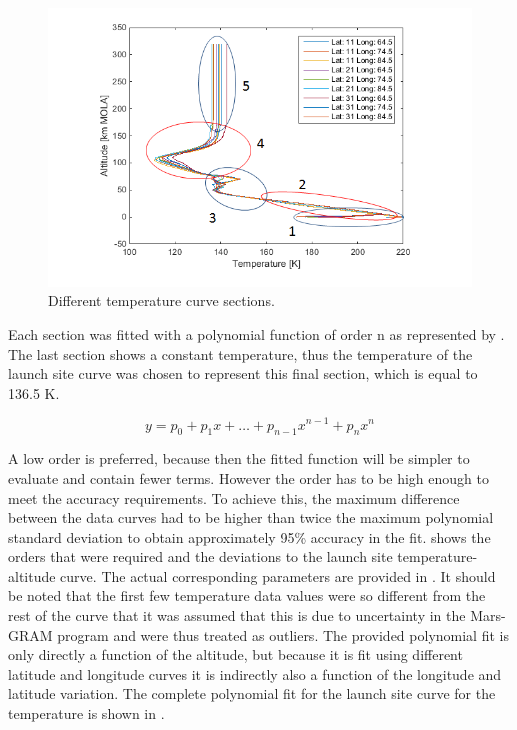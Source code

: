 \begin{figure}[H]
\centering
\includegraphics[width=1.0\textwidth]{figures/software/temperatureDataSplit5.png}
\caption{Different temperature curve sections.}
\label{fig:temperatureDataSplit5}
\end{figure}

\noindent
Each section was fitted with a polynomial function of order n as represented by . The last section shows a constant temperature, thus the temperature of the launch site curve was chosen to represent this final section, which is equal to 136.5 K.

\begin{equation} \label{eq:polyGenFunct}
y= p_{0}+p_{1}x+\dots+p_{n-1}x^{n-1}+p_{n}x^{n}
\end{equation}

\noindent
A low order is preferred, because then the fitted function will be simpler to evaluate and contain fewer terms. However the order has to be high enough to meet the accuracy requirements. To achieve this, the maximum difference between the data curves had to be higher than twice the maximum polynomial standard deviation to obtain approximately 95\% accuracy in the fit.  shows the orders that were required and the deviations to the launch site temperature-altitude curve. The actual corresponding parameters are provided in . It should be noted that the first few temperature data values were so different from the rest of the curve that it was assumed that this is due to uncertainty in the Mars-\ac{GRAM} program and were thus treated as outliers. The provided polynomial fit is only directly a function of the altitude, but because it is fit using different latitude and longitude curves it is indirectly also a function of the longitude and latitude variation. The complete polynomial fit for the launch site curve for the temperature is shown in .

